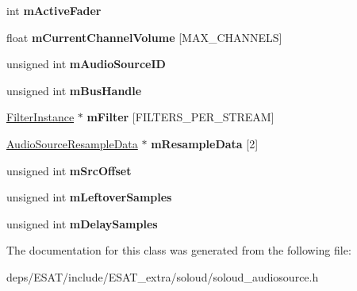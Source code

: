 \begin{DoxyCompactItemize}
\item 
\mbox{\label{class_so_loud_1_1_audio_source_instance_adb1dc272751b38268aab744ad1eec5bc}} 
int {\bfseries m\+Active\+Fader}
\item 
\mbox{\label{class_so_loud_1_1_audio_source_instance_a8179d47567eff8b07a714008a0a66a62}} 
float {\bfseries m\+Current\+Channel\+Volume} \mbox{[}M\+A\+X\+\_\+\+C\+H\+A\+N\+N\+E\+LS\mbox{]}
\item 
\mbox{\label{class_so_loud_1_1_audio_source_instance_a2ba43540b8967d86c7fc89bfa0dd3eee}} 
unsigned int {\bfseries m\+Audio\+Source\+ID}
\item 
\mbox{\label{class_so_loud_1_1_audio_source_instance_a74029328e5ae36b2b784ff04d9b18acf}} 
unsigned int {\bfseries m\+Bus\+Handle}
\item 
\mbox{\label{class_so_loud_1_1_audio_source_instance_a92c5642b02d67061b7e9809a9984c445}} 
\mbox{\hyperlink{class_so_loud_1_1_filter_instance}{Filter\+Instance}} $\ast$ {\bfseries m\+Filter} \mbox{[}F\+I\+L\+T\+E\+R\+S\+\_\+\+P\+E\+R\+\_\+\+S\+T\+R\+E\+AM\mbox{]}
\item 
\mbox{\label{class_so_loud_1_1_audio_source_instance_ae8470a70f90ae5b71170d3855e6b13d8}} 
\mbox{\hyperlink{struct_so_loud_1_1_audio_source_resample_data}{Audio\+Source\+Resample\+Data}} $\ast$ {\bfseries m\+Resample\+Data} \mbox{[}2\mbox{]}
\item 
\mbox{\label{class_so_loud_1_1_audio_source_instance_a41f9ed9f40b5b3602fc335491a0443c2}} 
unsigned int {\bfseries m\+Src\+Offset}
\item 
\mbox{\label{class_so_loud_1_1_audio_source_instance_a77e7ccc37e72c9a5ab812639f7f59dcb}} 
unsigned int {\bfseries m\+Leftover\+Samples}
\item 
\mbox{\label{class_so_loud_1_1_audio_source_instance_a326bc9edb5b29c92a6a855a72c3e38f9}} 
unsigned int {\bfseries m\+Delay\+Samples}
\end{DoxyCompactItemize}


The documentation for this class was generated from the following file\+:\begin{DoxyCompactItemize}
\item 
deps/\+E\+S\+A\+T/include/\+E\+S\+A\+T\+\_\+extra/soloud/soloud\+\_\+audiosource.\+h\end{DoxyCompactItemize}
